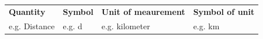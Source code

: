 \begin{enumerate}[noitemsep, label=\textbf{\arabic*}. ]
{\begin{tabular}[t]{|l|l|l|l|}
    
        \textbf{Quantity} &
    
    
        \textbf{Symbol} &
    
    
        \textbf{Unit of meaurement} &
    
    
        \textbf{Symbol of unit}%
     \tabularnewline\cline{1-1}\cline{2-2}\cline{3-3}\cline{4-4}
    
    
        e.g. Distance &
    
    
        e.g. d &
    
    
        e.g. kilometer &
    
    
        e.g. km%
     \tabularnewline\cline{1-1}\cline{2-2}\cline{3-3}\cline{4-4}
    

\end{tabular}}
\end{enumerate}
